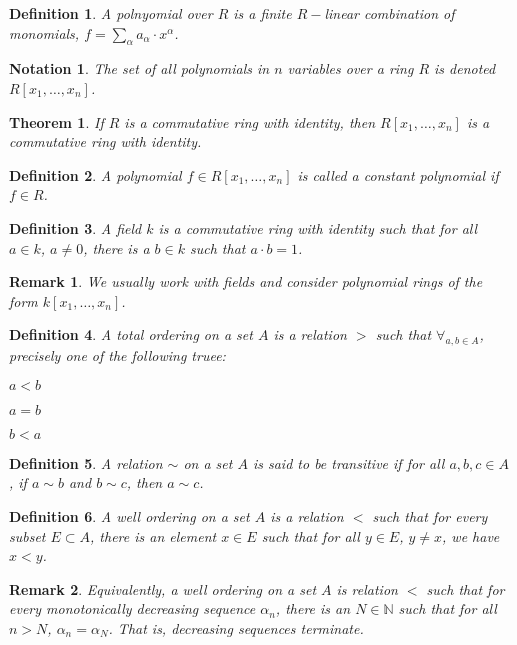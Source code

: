 \documentclass{article}
\theoremstyle{mystyle}
\newtheorem{theorem}{Theorem}[section]
\newtheorem{definition}{Definition}[section]
\newtheorem{remark}{Remark}[section]
\newtheorem{notation}{Notation}[section]
\begin{document}
\begin{definition}
A polnyomial over $R$ is a finite $R-$linear combination of monomials, $f=\sum_{\alpha} a_{\alpha} \cdot x^{\alpha}$.
\end{definition}
\begin{notation}
The set of all polynomials in $n$ variables over a ring $R$ is denoted $R[x_1,\hdots, x_n]$.
\end{notation}
\begin{theorem}
If $R$ is a commutative ring with identity, then $R[x_1,\hdots, x_n]$ is a commutative ring with identity.
\end{theorem}
\begin{definition}
A polynomial $f\in R[x_1,\hdots, x_n]$ is called a constant polynomial if $f\in R$.
\end{definition}
\begin{definition}
A field $k$ is a commutative ring with identity such that for all $a\in k$, $a\ne 0$, there is a $b\in k$ such that $a\cdot b = 1$.
\end{definition}
\begin{remark}
We usually work with fields and consider polynomial rings of the form $k[x_1,\hdots ,x_n]$.
\end{remark}
\begin{definition}
A total ordering on a set $A$ is a relation $>$ such that $\forall_{a,b\in A}$, precisely one of the following truee:
\begin{enumerate}
    \begin{multicols}{3}
    \item $a < b$
    \item $a=b$
    \item $b<a$
    \end{multicols}
\end{enumerate}
\end{definition}
\begin{definition}
A relation $\sim$ on a set $A$ is said to be transitive if for all $a,b,c\in A$, if $a\sim b$ and $b\sim c$, then $a\sim c$.
\end{definition}
\begin{definition}
A well ordering on a set $A$ is a relation $<$ such that for every subset $E\subset A$, there is an element $x\in E$ such that for all $y\in E$, $y\ne x$, we have $x<y$.
\end{definition}
\begin{remark}
Equivalently, a well ordering on a set $A$ is relation $<$ such that for every monotonically decreasing sequence $\alpha_n$, there is an $N\in \mathbb{N}$ such that for all $n>N$, $\alpha_n = \alpha_N$. That is, decreasing sequences terminate.
\end{remark}
\end{document}
